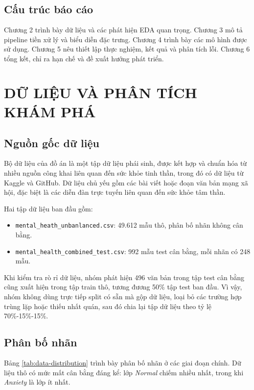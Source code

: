 \documentclass[12pt,a4paper,oneside]{report}
\newlength{\manualparindent}
\newcommand{\manualindent}{\hspace*{\manualparindent}}
\begin{document}
\section{Cấu trúc báo cáo}

\manualindent%
Chương 2 trình bày dữ liệu và các phát hiện EDA quan trọng. Chương 3 mô tả pipeline tiền xử lý và biểu diễn đặc trưng. Chương 4 trình bày các mô hình được sử dụng. Chương 5 nêu thiết lập thực nghiệm, kết quả và phân tích lỗi. Chương 6 tổng kết, chỉ ra hạn chế và đề xuất hướng phát triển.

\chapter{DỮ LIỆU VÀ PHÂN TÍCH KHÁM PHÁ}

\section{Nguồn gốc dữ liệu}

\manualindent%
Bộ dữ liệu của đồ án là một tập dữ liệu phái sinh, được kết hợp và chuẩn hóa từ nhiều nguồn công khai liên quan đến sức khỏe tinh thần, trong đó có dữ liệu từ Kaggle và GitHub. Dữ liệu chủ yếu gồm các bài viết hoặc đoạn văn bản mạng xã hội, đặc biệt là các diễn đàn trực tuyến liên quan đến sức khỏe tâm thần.

\manualindent%
Hai tập dữ liệu ban đầu gồm:

\begin{itemize}
  \item \texttt{mental\_heath\_unbanlanced.csv}: 49.612 mẫu thô, phân bố nhãn không cân bằng.
  \item \texttt{mental\_health\_combined\_test.csv}: 992 mẫu test cân bằng, mỗi nhãn có 248 mẫu.
\end{itemize}

\manualindent%
Khi kiểm tra rò rỉ dữ liệu, nhóm phát hiện 496 văn bản trong tập test cân bằng cũng xuất hiện trong tập train thô, tương đương 50\% tập test ban đầu. Vì vậy, nhóm không dùng trực tiếp split có sẵn mà gộp dữ liệu, loại bỏ các trường hợp trùng lặp hoặc thiếu nhất quán, sau đó chia lại tập dữ liệu theo tỷ lệ 70\%-15\%-15\%.

\section{Phân bố nhãn}

\manualindent%
Bảng \ref{tab:data-distribution} trình bày phân bố nhãn ở các giai đoạn chính. Dữ liệu thô có mức mất cân bằng đáng kể: lớp \textit{Normal} chiếm nhiều nhất, trong khi \textit{Anxiety} là lớp ít nhất.
\end{document}
